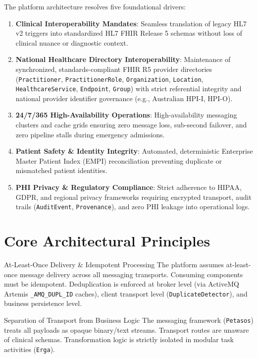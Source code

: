 The platform architecture resolves five foundational drivers:
\begin{enumerate}
    \item \textbf{Clinical Interoperability Mandates}: Seamless translation of legacy HL7 v2 triggers into standardized HL7 FHIR Release 5 schemas without loss of clinical nuance or diagnostic context.
    \item \textbf{National Healthcare Directory Interoperability}: Maintenance of synchronized, standards-compliant FHIR R5 provider directories (\texttt{Practitioner}, \texttt{PractitionerRole}, \texttt{Organization}, \texttt{Location}, \texttt{HealthcareService}, \texttt{Endpoint}, \texttt{Group}) with strict referential integrity and national provider identifier governance (e.g., Australian HPI-I, HPI-O).
    \item \textbf{24/7/365 High-Availability Operations}: High-availability messaging clusters and cache grids ensuring zero message loss, sub-second failover, and zero pipeline stalls during emergency admissions.
    \item \textbf{Patient Safety \& Identity Integrity}: Automated, deterministic Enterprise Master Patient Index (EMPI) reconciliation preventing duplicate or mismatched patient identities.
    \item \textbf{PHI Privacy \& Regulatory Compliance}: Strict adherence to HIPAA, GDPR, and regional privacy frameworks requiring encrypted transport, audit trails (\texttt{AuditEvent}, \texttt{Provenance}), and zero PHI leakage into operational logs.
\end{enumerate}

\section{Core Architectural Principles}

\begin{principlebox}{At-Least-Once Delivery \& Idempotent Processing}
The platform assumes at-least-once message delivery across all messaging transports. Consuming components must be idempotent. Deduplication is enforced at broker level (via ActiveMQ Artemis \texttt{\_AMQ\_DUPL\_ID} caches), client transport level (\texttt{DuplicateDetector}), and business persistence level.
\end{principlebox}

\begin{principlebox}{Separation of Transport from Business Logic}
The messaging framework (\texttt{Petasos}) treats all payloads as opaque binary/text streams. Transport routes are unaware of clinical schemas. Transformation logic is strictly isolated in modular task activities (\texttt{Erga}).
\end{principlebox}

